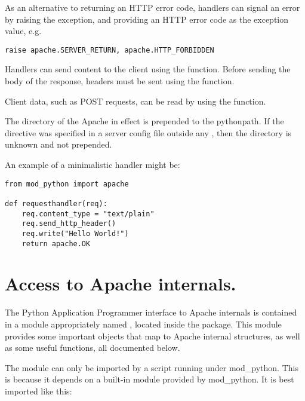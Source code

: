 As an alternative to returning an HTTP error code, handlers can signal
an error by raising the  exception, and providing
an HTTP error code as the exception value, e.g.

\begin{verbatim}
raise apache.SERVER_RETURN, apache.HTTP_FORBIDDEN
\end{verbatim}
              
Handlers can send content to the client using the 
function. Before sending the body of the response, headers must be
sent using the  function.

Client data, such as POST requests, can be read by using the
 function.

 The directory of the Apache  
in effect is prepended to the pythonpath. If the directive was
specified in a server config file outside any , then
the directory is unknown and not prepended.

An example of a minimalistic handler might be: 

\begin{verbatim}
from mod_python import apache

def requesthandler(req):
    req.content_type = "text/plain"
    req.send_http_header()
    req.write("Hello World!")
    return apache.OK
\end{verbatim}



\section{ Access to Apache internals.}

The Python Application Programmer interface to Apache internals is
contained in a module appropriately named , located inside the
 package. This module provides some important objects that
map to Apache internal structures, as well as some useful functions,
all documented below.

The  module can only be imported by a script running under
mod_python. This is because it depends on a built-in module
 provided by mod_python. It is best imported like this:

